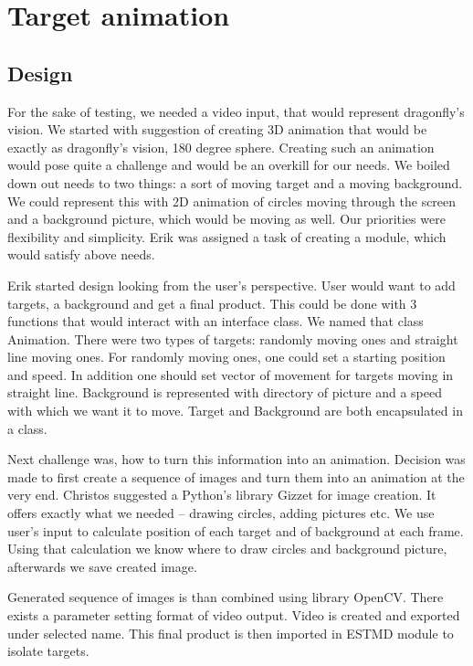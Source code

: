 \documentclass[hidelinks,a4paper,11pt]{article}
\begin{document}
\section{Target animation}

\subsection{Design}

For the sake of testing, we needed a video input, that would represent dragonfly's vision. We started with suggestion of creating 3D animation that would be exactly as dragonfly's vision, 180 degree sphere. Creating such an animation would pose quite a challenge and would be an overkill for our needs. We boiled down out needs to two things: a sort of moving target and a moving background. We could represent this with 2D animation of circles moving through the screen and a background picture, which would be moving as well. Our priorities were flexibility and simplicity. Erik was assigned a task of creating a module, which would satisfy above needs.

Erik started design looking from the user's perspective. User would want to add targets, a background and get a final product. This could be done with 3 functions that would interact with an interface class. We named that class Animation. There were two types of targets: randomly moving ones and straight line moving ones. For randomly moving ones, one could set a starting position and speed. In addition one should set vector of movement for targets moving in straight line. Background is represented with directory of picture and a speed with which we want it to move. Target and Background are both encapsulated in a class.

Next challenge was, how to turn this information into an animation. Decision was made to first create a sequence of images and turn them into an animation at the very end. Christos suggested a Python's library Gizzet for image creation. It offers exactly what we needed – drawing circles, adding pictures etc. We use user's input to calculate position of each target and of background at each frame. Using that calculation we know where to draw circles and background picture, afterwards we save created image.

Generated sequence of images is than combined using library OpenCV. There exists a parameter setting format of video output. Video is created and exported under selected name. This final product is then imported in ESTMD module to isolate targets.
\end{document}
